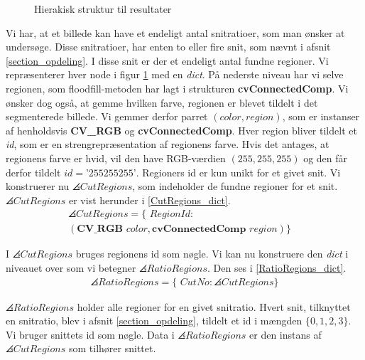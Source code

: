 {\begin{figure}[!h]
    \caption[]{Hierakisk struktur til resultater}
    \label{resultat_hieraki}
\end{figure}

Vi har, at et billede kan have et endeligt antal snitratioer, som man
ønsker at undersøge. Disse snitratioer, har enten to eller fire snit,
som nævnt i afsnit \ref{section_opdeling}. I disse snit er der et
endeligt antal fundne regioner. Vi repræsenterer hver node i figur
\ref{resultat_hieraki} med en \emph{dict}. På nederste niveau har vi
selve regionen, som floodfill-metoden har lagt i strukturen
\textbf{cvConnectedComp}. Vi ønsker dog også, at gemme hvilken farve,
regionen er blevet tildelt i det segmenterede billede. Vi gemmer derfor
parret $(color, region)$, som er instanser af henholdsvis
\textbf{CV\_RGB} og \textbf{cvConnectedComp}. Hver region bliver tildelt
et \emph{id}, som er en strengrepræsentation af regionens farve.  Hvis
det antages, at regionens farve er hvid, vil den have RGB-værdien $(255,
255, 255)$ og den får derfor tildelt $id = \textrm{'255255255'}$.
Regioners id er kun unikt for et givet snit. Vi konstruerer nu
$\angles{CutRegions}$, som indeholder de fundne regioner for et snit.
$\angles{CutRegions}$ er vist herunder i \eqref{CutRegions_dict}.
\begin{multline}
    \angles{CutRegions} = \{ \textit{~RegionId} : \\
    (\textbf{CV\_RGB~}\textit{color}, \textbf{cvConnectedComp~}\textit{region}) \}\quad
    \label{CutRegions_dict}
\end{multline}

\noindent I $\angles{CutRegions}$ bruges regionens id som nøgle. Vi kan nu
konstruere den \emph{dict} i niveauet over som vi betegner
$\angles{RatioRegions}$. Den ses i \eqref{RatioRegions_dict}.
\begin{eqnarray}
    \angles{RatioRegions} = \{ \textit{~CutNo} : \angles{CutRegions} \}
    \label{RatioRegions_dict}
\end{eqnarray}

\noindent $\angles{RatioRegions}$ holder alle regioner for en givet
snitratio.  Hvert snit, tilknyttet en snitratio, blev i afsnit
\ref{section_opdeling}, tildelt et id i mængden $\{0,1,2,3\}$. Vi bruger
snittets id som nøgle.  Data i $\angles{RatioRegions}$ er den instans af
$\angles{CutRegions}$ som tilhører snittet.

}
